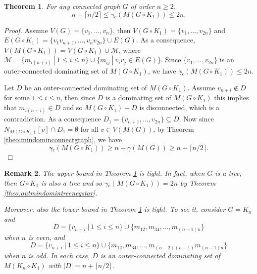 \documentclass[a4paper,12pt, reqno]{amsart}
\newtheorem{Theorem}{Theorem}[section]
\newtheorem{Remark}[Theorem]{Remark}
\begin{document}
\begin{Theorem}\label{theo:minoutdomincorona}
	For any connected graph $G$ of order $n\geq 2$, $$n+\lceil n/2 \rceil \leq \gamma{\tilde{}} _{c}(M(G\circ K_1)) \leq 2n.$$
\end{Theorem}
\begin{proof} 
	Assume $V(G)=\{v_1,\dots, v_{n}\}$, then $V(G\circ K_1)= \{v_{1},\dots, v_{2n}\}$ and $E(G\circ K_1)=\{v_1v_{n+1},\dots, v_nv_{2n} \}\cup E(G) $. As a consequence, $V(M(G\circ K_1))=V(G\circ K_1)\cup \mathcal{M}$, where $\mathcal{M}=\{ m_{i(n+i)}~|~1\leq i \leq n \}\cup \{ m_{ij}~|~v_iv_j\in  E(G)\}$.
	Since $\{v_1,\dots, v_{2n}\}$ is an outer-connected dominating set of $M(G\circ K_1)$, we have $\gamma{\tilde{}} _{c}(M(G\circ K_1)) \leq 2n$.

	 Let $D$ be an outer-connected dominating set of $M(G\circ K_1)$. %
	 Assume $v_{n+i} \notin D$ for some $1 \le i \le n$, then since $D$ is a dominating set of $M(G\circ K_1)$ this implies that $m_{i(n+i)} \in D$ and so $M(G\circ K_1)-D$ is disconnected, which is a contradiction. As a consequence $D_1=\{v_{n+1},\dots, v_{2n}\}\subseteq D$. Now since $N_{M(G\circ K_1)}[v] \cap D_{1}=\emptyset$ for all $v \in V(M(G))$, by Theorem \ref{theo:mindominconnectgraph}, we have $$\gamma{\tilde{}} _{c}(M(G\circ K_1)) \geq n+\gamma(M(G)) \geq n+\lceil n/2 \rceil.$$

\end{proof}
\begin{Remark}
The upper bound in Theorem \ref{theo:minoutdomincorona} is tight. In fact, when $G$ is a tree, then $G\circ K_1$ is also a tree and so $\gamma{\tilde{}} _{c}(M(G\circ K_1))=2n$ by Theorem \ref{theo:outmindomintreeneqstar}.

Moreover, also the lower bound in Theorem \ref{theo:minoutdomincorona} is tight. To see it, consider $G=K_n$ and 
$$D=\{v_{n+i}~|~1 \leq i \leq n\} \cup \{m_{12}, m_{34}, \dots, m_{(n-1)n}\}$$	when $n$ is even, and 
$$D=\{v_{n+i}~|~1 \leq i \leq n\} \cup \{m_{12}, m_{34}, \dots, m_{(n-2)(n-1)} m_{(n-1)n}\}$$	when $n$ is odd. In each case, $D$ is an outer-connected dominating set of $M(K_n\circ K_1)$ with $|D|=n+\lceil n/2 \rceil$.
\end{Remark}
\end{document}
